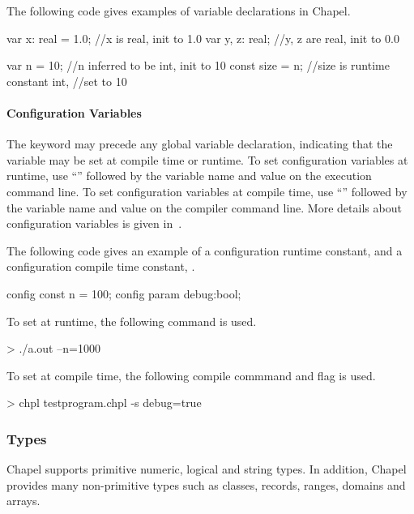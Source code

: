 \begin{example}
The following code gives examples of variable declarations in Chapel.
\begin{chapel}
var x: real = 1.0; //x is real, init to 1.0
var y, z: real; //y, z are real, init to 0.0

var n = 10; //n inferred to be int, init to 10
const size = n; //size is runtime constant int,
                //set to 10
\end{chapel}
\end{example}

\paragraph{Configuration Variables}
The keyword  may precede any global variable
declaration, indicating that the variable may be set at
compile time or runtime.
To set configuration variables at runtime, use ``\chpl{--}''
followed by the variable name and value on the execution
command line.
To set configuration variables at compile time, use
``'' followed by the variable name and value on the
compiler command line.  More details about configuration
variables is given in~.

\begin{example}
The following code gives an example of a configuration
runtime constant,  and a configuration compile time constant,
.
\begin{chapel}
config const n = 100;
config param debug:bool;
\end{chapel}

To set  at runtime, the following command is used.
\begin{commandline}
> ./a.out --n=1000
\end{commandline}

To set  at compile time, the following compile commmand
and flag is used.
\begin{commandline}
> chpl testprogram.chpl -s debug=true
\end{commandline}
\end{example}

\subsubsection{Types}
Chapel supports primitive numeric, logical and string types.  In
addition, Chapel provides many non-primitive types such as classes,
records, ranges, domains and arrays.  

